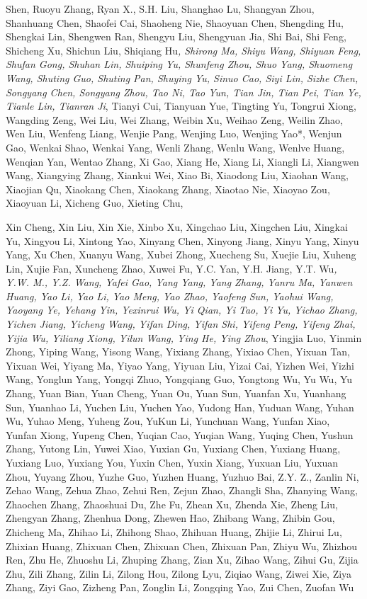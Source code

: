 \documentclass[
  10
]{article}
\begin{document}
Shen, Ruoyu Zhang, Ryan X., S.H. Liu, Shanghao Lu, Shangyan Zhou,
Shanhuang Chen, Shaofei Cai, Shaoheng Nie, Shaoyuan Chen, Shengding Hu,
Shengkai Lin, Shengwen Ran, Shengyu Liu, Shengyuan Jia, Shi Bai, Shi
Feng, Shicheng Xu, Shichun Liu, Shiqiang Hu\emph{, Shirong Ma, Shiyu
Wang, Shiyuan Feng, Shufan Gong, Shuhan Lin, Shuiping Yu, Shunfeng Zhou,
Shuo Yang, Shuomeng Wang, Shuting Guo, Shuting Pan, Shuying Yu, Sinuo
Cao, Siyi Lin, Sizhe Chen, Songyang Chen, Songyang Zhou, Tao Ni, Tao
Yun, Tian Jin, Tian Pei, Tian Ye, Tianle Lin, Tianran Ji}, Tianyi Cui,
Tianyuan Yue, Tingting Yu, Tongrui Xiong, Wangding Zeng, Wei Liu, Wei
Zhang, Weibin Xu, Weihao Zeng, Weilin Zhao, Wen Liu, Wenfeng Liang,
Wenjie Pang, Wenjing Luo, Wenjing Yao*, Wenjun Gao, Wenkai Shao, Wenkai
Yang, Wenli Zhang, Wenlu Wang, Wenlve Huang, Wenqian Yan, Wentao Zhang,
Xi Gao, Xiang He, Xiang Li, Xiangli Li, Xiangwen Wang, Xiangying Zhang,
Xiankui Wei, Xiao Bi, Xiaodong Liu, Xiaohan Wang, Xiaojian Qu, Xiaokang
Chen, Xiaokang Zhang, Xiaotao Nie, Xiaoyao Zou, Xiaoyuan Li, Xicheng
Guo, Xieting Chu,

Xin Cheng, Xin Liu, Xin Xie, Xinbo Xu, Xingchao Liu, Xingchen Liu,
Xingkai Yu, Xingyou Li, Xintong Yao, Xinyang Chen, Xinyong Jiang, Xinyu
Yang, Xinyu Yang, Xu Chen, Xuanyu Wang, Xubei Zhong, Xuecheng Su, Xuejie
Liu, Xuheng Lin, Xujie Fan, Xuncheng Zhao, Xuwei Fu, Y.C. Yan, Y.H.
Jiang, Y.T. Wu\emph{, Y.W. M., Y.Z. Wang, Yafei Gao, Yang Yang, Yang
Zhang, Yanru Ma, Yanwen Huang, Yao Li, Yao Li, Yao Meng, Yao Zhao,
Yaofeng Sun, Yaohui Wang, Yaoyang Ye, Yehang Yin, Yexinrui Wu, Yi Qian,
Yi Tao, Yi Yu, Yichao Zhang, Yichen Jiang, Yicheng Wang, Yifan Ding,
Yifan Shi, Yifeng Peng, Yifeng Zhai, Yijia Wu, Yiliang Xiong, Yilun
Wang, Ying He, Ying Zhou}, Yingjia Luo, Yinmin Zhong, Yiping Wang,
Yisong Wang, Yixiang Zhang, Yixiao Chen, Yixuan Tan, Yixuan Wei, Yiyang
Ma, Yiyao Yang, Yiyuan Liu, Yizai Cai, Yizhen Wei, Yizhi Wang, Yonglun
Yang, Yongqi Zhuo, Yongqiang Guo, Yongtong Wu, Yu Wu, Yu Zhang, Yuan
Bian, Yuan Cheng, Yuan Ou, Yuan Sun, Yuanfan Xu, Yuanhang Sun, Yuanhao
Li, Yuchen Liu, Yuchen Yao, Yudong Han, Yuduan Wang, Yuhan Wu, Yuhao
Meng, Yuheng Zou, YuKun Li, Yunchuan Wang, Yunfan Xiao, Yunfan Xiong,
Yupeng Chen, Yuqian Cao, Yuqian Wang, Yuqing Chen, Yushun Zhang, Yutong
Lin, Yuwei Xiao, Yuxian Gu, Yuxiang Chen, Yuxiang Huang, Yuxiang Luo,
Yuxiang You, Yuxin Chen, Yuxin Xiang, Yuxuan Liu, Yuxuan Zhou, Yuyang
Zhou, Yuzhe Guo, Yuzhen Huang, Yuzhuo Bai, Z.Y. Z., Zanlin Ni, Zehao
Wang, Zehua Zhao, Zehui Ren, Zejun Zhao, Zhangli Sha, Zhanying Wang,
Zhaochen Zhang, Zhaoshuai Du, Zhe Fu, Zhean Xu, Zhenda Xie, Zheng Liu,
Zhengyan Zhang, Zhenhua Dong, Zhewen Hao, Zhibang Wang, Zhibin Gou,
Zhicheng Ma, Zhihao Li, Zhihong Shao, Zhihuan Huang, Zhijie Li, Zhirui
Lu, Zhixian Huang, Zhixuan Chen, Zhixuan Chen, Zhixuan Pan, Zhiyu Wu,
Zhizhou Ren, Zhu He, Zhuoshu Li, Zhuping Zhang, Zian Xu, Zihao Wang,
Zihui Gu, Zijia Zhu, Zili Zhang, Zilin Li, Zilong Hou, Zilong Lyu,
Ziqiao Wang, Ziwei Xie, Ziya Zhang, Ziyi Gao, Zizheng Pan, Zonglin Li,
Zongqing Yao, Zui Chen, Zuofan Wu
\end{document}
